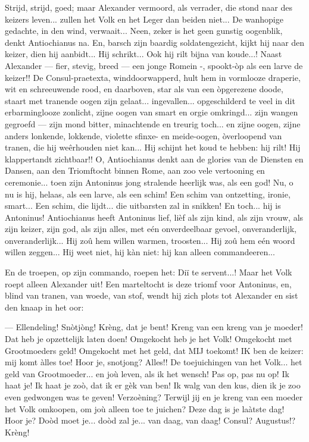 \documentclass[a4paper, 12pt, oneside, dutch]{article}
\begin{document}
Strijd, strijd, goed; maar Alexander vermoord, als verrader, die stond naar des keizers leven... zullen het Volk en het Leger dan beiden niet... De wanhopige gedachte, in den wind, verwaait... Neen, zeker is het geen gunstig oogenblik, denkt Antiochianus na. En, barsch zijn baardig soldatengezicht, kijkt hij naar den keizer, dien hij aanbidt... Hij schrikt... Ook hij rilt bijna van koude...! Naast Alexander --- fier, stevig, breed --- een jonge Romein -, spookt-òp als een larve de keizer!! De Consul-praetexta, winddoorwapperd, hult hem in vormlooze draperie, wit en schreeuwende rood, en daarboven, star als van een òpgerezene doode, staart met tranende oogen zijn gelaat... ingevallen... opgeschilderd te veel in dit erbarminglooze zonlicht, zijne oogen van smart en orgie omkringd... zijn wangen gegroefd --- zijn mond bitter, minachtende en treurig toch... en zijne oogen, zijne anders lonkende, lokkende, violette sfinxe- en meide-oogen, òverloopend van tranen, die hij weêrhouden niet kan... Hij schijnt het koud te hebben: hij rilt! Hij klappertandt zichtbaar!! O, Antiochianus denkt aan de glories van de Diensten en Dansen, aan den Triomftocht binnen Rome, aan zoo vele vertooning en ceremonie... toen zijn Antoninus jong stralende heerlijk was, als een god! Nu, o nu is hij, helaas, als een larve, als een schim! Een schim van ontzetting, ironie, smart... Een schim, die lijdt... die uitbarsten zal in snikken! En toch... hij is Antoninus! Antiochianus heeft Antoninus lief, lièf als zijn kind, als zijn vrouw, als zijn keizer, zijn god, als zijn alles, met eén onverdeelbaar gevoel, onveranderlijk, onveranderlijk... Hij zoû hem willen warmen, troosten... Hij zoû hem eén woord willen zeggen... Hij weet niet, hij kàn niet: hij kan alleen commandeeren...

En de troepen, op zijn commando, roepen het: Diï te servent...! Maar het Volk roept alleen Alexander uit! Een marteltocht is deze triomf voor Antoninus, en, blind van tranen, van woede, van stof, wendt hij zich plots tot Alexander en sist den knaap in het oor:

--- Ellendeling! Snòtjòng! Krèng, dat je bent! Kreng van een kreng van je moeder! Dat heb je opzettelijk laten doen! Omgekocht heb je het Volk! Omgekocht met Grootmoeders geld! Omgekocht met het geld, dat MIJ toekomt! IK ben de keizer: mij komt àlles toe! Hoor je, snotjong? Alles!! De toejuichingen van het Volk... het geld van Grootmoeder... en joù leven, als ik het wensch! Pas op, pas nu op! Ik haat je! Ik haat je zoò, dat ik er gèk van ben! Ik walg van den kus, dien ik je zoo even gedwongen was te geven! Verzoèning? Terwijl jij en je kreng van een moeder het Volk omkoopen, om joù alleen toe te juichen? Deze dag is je laàtste dag! Hoor je? Doòd moet je... doòd zal je... van daag, van daag! Consul? Augustus!? Krèng!
\end{document}
